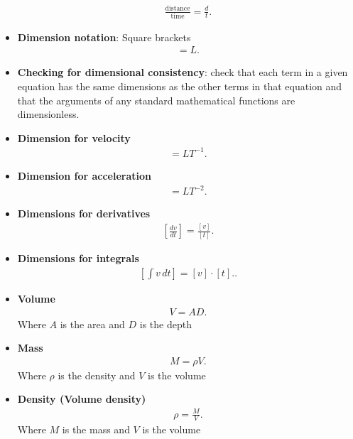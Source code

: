 \documentclass{report}
\begin{document}
\begin{itemize}
\begin{align*}
                \frac{\text{distance}}{\text{time}} = \frac{d}{t}
            .\end{align*}
        \item \textbf{Dimension notation}: Square brackets
            \begin{align*}
                [r] = L
            .\end{align*}
        \item \textbf{Checking for dimensional consistency}: 
            check that each term in a given equation has the same dimensions as the other terms in that equation and that the arguments of any standard mathematical functions are dimensionless.
        \item \textbf{Dimension for velocity}
            \begin{align*}
                [v] = LT^{-1}
            .\end{align*}
        \item \textbf{Dimension for acceleration}
            \begin{align*}
                [a] = LT^{-2}
            .\end{align*}
        \item \textbf{Dimensions for derivatives}
            \begin{align*}
                \left[\frac{dv}{dt}\right] = \frac{[v]}{[t]}
            .\end{align*}
        \item \textbf{Dimensions for integrals}
            \begin{align*}
                \left[ \int v \, dt \right] = [v] \cdot [t].
            .\end{align*}
        \item \textbf{Volume}
            \begin{align*}
                V = AD
            .\end{align*}
            Where $A$ is the area and $D$ is the depth
        \item \textbf{Mass}
            \begin{align*}
                M = \rho V
            .\end{align*}
            Where $\rho$ is the density and $V$ is the volume
        \item \textbf{Density (Volume density)}
            \begin{align*}
                \rho = \frac{M}{V}
            .\end{align*}
            Where $M$ is the mass and $V$ is the volume

\end{itemize}
\end{document}
